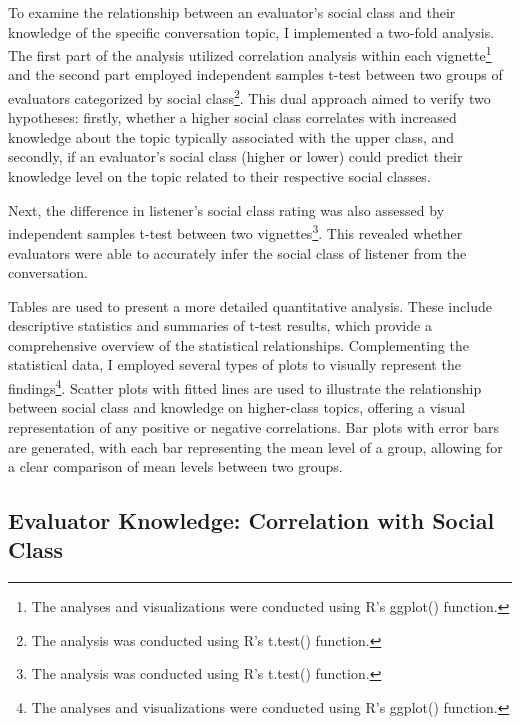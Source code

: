 \documentclass[
  man,floatsintext]{apa6}
\begin{document}
To examine the relationship between an evaluator's social class and their knowledge of the specific conversation topic, I implemented a two-fold analysis. The first part of the analysis utilized correlation analysis within each vignette\footnote{The analyses and visualizations were conducted using R's ggplot() function.} and the second part employed independent samples t-test between two groups of evaluators categorized by social class\footnote{The analysis was conducted using R's t.test() function.}. This dual approach aimed to verify two hypotheses: firstly, whether a higher social class correlates with increased knowledge about the topic typically associated with the upper class, and secondly, if an evaluator's social class (higher or lower) could predict their knowledge level on the topic related to their respective social classes.

Next, the difference in listener's social class rating was also assessed by independent samples t-test between two vignettes\footnote{The analysis was conducted using R's t.test() function.}. This revealed whether evaluators were able to accurately infer the social class of listener from the conversation.

Tables are used to present a more detailed quantitative analysis. These include descriptive statistics and summaries of t-test results, which provide a comprehensive overview of the statistical relationships. Complementing the statistical data, I employed several types of plots to visually represent the findings\footnote{The analyses and visualizations were conducted using R's ggplot() function.}. Scatter plots with fitted lines are used to illustrate the relationship between social class and knowledge on higher-class topics, offering a visual representation of any positive or negative correlations. Bar plots with error bars are generated, with each bar representing the mean level of a group, allowing for a clear comparison of mean levels between two groups.

\hypertarget{evaluator-knowledge-correlation-with-social-class}{%
\subsection{Evaluator Knowledge: Correlation with Social Class}\label{evaluator-knowledge-correlation-with-social-class}}
\end{document}
